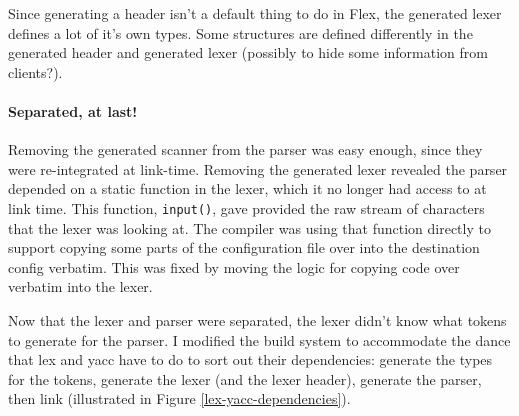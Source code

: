 \documentclass[12pt]{article}
\newcommand{\code}[1]{{\tt #1}}
\begin{document}
Since generating a header isn't a default thing to do in Flex, the generated
lexer defines a lot of it's own types. Some structures are defined differently
in the generated header and generated lexer (possibly to hide some information
from clients?).

\begin{comment}
\begin{figure}
\label{include-c-h}\caption{This generated type errors}
In the lex.yy.h:
\begin{verbatim}
#ifndef YY_STRUCT_YY_BUFFER_STATE
#define YY_STRUCT_YY_BUFFER_STATE
struct yy_buffer_state
    /* stuff */
#endif
\end{verbatim}

In lex.yy.c:
\begin{verbatim}
#ifndef YY_STRUCT_YY_BUFFER_STATE
#define YY_STRUCT_YY_BUFFER_STATE
struct yy_buffer_state
    /* stuff */
    /* Even more stuff, not defined before. */
#endif
\end{verbatim}

In the parser:
\begin{verbatim}
#include "lex.yy.h"
[... snip ...]
#include "lex.yy.c"
\end{verbatim}
\end{figure}
\end{comment}

\paragraph{Separated, at last!}
Removing the generated scanner from the parser was easy enough, since they were
re-integrated at link-time. Removing the generated lexer revealed the 
parser depended on a static function in the lexer, which it no longer had
access to at link time. This function, \code{input()}, gave provided the raw
stream of characters that the lexer was looking at. The compiler was using that
function directly to support copying some parts of the configuration file over
into the destination config verbatim. This was fixed by moving the logic for
copying code over verbatim into the lexer.

Now that the lexer and parser were separated, the lexer didn't know what tokens
to generate for the parser. I modified the build system to accommodate the dance
that lex and yacc have to do to sort out their dependencies: generate the types
for the tokens, generate the lexer (and the lexer header), generate the parser,
then link (illustrated in Figure \ref{lex-yacc-dependencies}).
\end{document}
